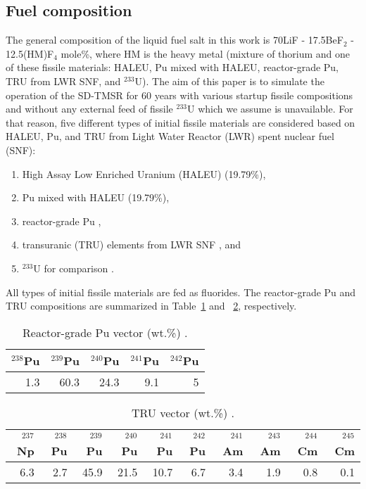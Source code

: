 \subsection{Fuel composition}
The general composition of the liquid fuel salt in this work is 70LiF - 
17.5BeF$_2$ - 12.5(HM)F$_4$ mole\%, where HM is the heavy metal (mixture of 
thorium and one of these fissile materials: \gls{HALEU}, Pu mixed with \gls{HALEU}, reactor-grade Pu, \gls{TRU} from LWR SNF, and $^{233}$U).
The aim of this paper is to simulate the  
operation of the \gls{SD-TMSR} for 60 years with various startup fissile 
compositions and without any external feed of fissile $^{233}$U which we 
assume is unavailable. For that reason, five different types of initial 
fissile materials are considered based on \gls{HALEU}, Pu, and \gls{TRU} from Light Water
Reactor (LWR) spent nuclear fuel (SNF):
\begin{enumerate}[label=(\alph*)]
	\item High Assay Low Enriched Uranium (HALEU) (19.79\%),
	\item Pu mixed with \gls{HALEU} (19.79\%),
	\item reactor-grade Pu \cite{marka1993explosive},
	\item transuranic (TRU) elements from LWR SNF \cite{de2000scenarios}, and
	\item $^{233}$U for comparison \cite{ashraf2019whole_core}.
\end{enumerate}
All types of initial fissile materials are fed as fluorides.
The reactor-grade Pu and \gls{TRU} compositions are summarized in 
Table~\ref{tab:table2} and ~\ref{tab:table3}, respectively.

\begin{table}  %
	\caption{Reactor-grade Pu vector (wt.\%) \cite{marka1993explosive}.}
	\vspace{0.1in}
	\begin{tabularx}{\textwidth}{r r r r r}
		\hline
		$^{238}$Pu & $^{239}$Pu & $^{240}$Pu & $^{241}$Pu & $^{242}$Pu \\
		\hline
		 1.3&60.3&24.3&9.1&5 \\
		\hline
	\end{tabularx}
	\label{tab:table2}
\end{table}

\begin{table}  %
	\caption{\gls{TRU} vector (wt.\%) \cite{de2000scenarios}.}
	\vspace{0.1in}
	\begin{tabularx}{\textwidth}{r r r r r r r r r r}
		\hline
		$^{237}$Np&$^{238}$Pu & $^{239}$Pu & $^{240}$Pu & $^{241}$Pu & $^{242}$Pu&$^{241}$Am &$^{243}$Am&$^{244}$Cm &$^{245}$Cm\\
		\hline
		6.3&2.7&45.9&21.5&10.7&6.7&3.4&1.9&0.8&0.1 \\
		\hline
	\end{tabularx}
	\label{tab:table3}
\end{table}

